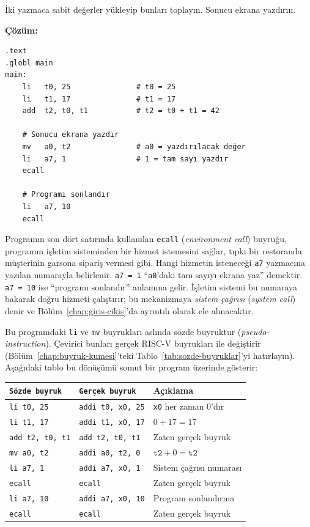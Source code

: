 \begin{ornek}[4.1]
\label{orn:iki-yazmac-topla}
İki yazmaca sabit değerler yükleyip bunları toplayın. Sonucu ekrana yazdırın.

\textbf{Çözüm:}

\begin{lstlisting}[style=riscv]
.text
.globl main
main:
    li   t0, 25               # t0 = 25
    li   t1, 17               # t1 = 17
    add  t2, t0, t1           # t2 = t0 + t1 = 42

    # Sonucu ekrana yazdır
    mv   a0, t2               # a0 = yazdırılacak değer
    li   a7, 1                # 1 = tam sayı yazdır
    ecall

    # Programı sonlandır
    li   a7, 10
    ecall
\end{lstlisting}

Programın son dört satırında kullanılan \texttt{ecall} (\emph{environment call}) buyruğu, programın işletim sisteminden bir hizmet istemesini sağlar, tıpkı bir restoranda müşterinin garsona sipariş vermesi gibi. Hangi hizmetin isteneceği \texttt{a7} yazmacına yazılan numarayla belirlenir. \texttt{a7\,=\,1} ``\texttt{a0}'daki tam sayıyı ekrana yaz'' demektir. \texttt{a7\,=\,10} ise ``programı sonlandır'' anlamına gelir. İşletim sistemi bu numaraya bakarak doğru hizmeti çalıştırır; bu mekanizmaya \emph{sistem çağrısı} (\emph{system call}) denir ve Bölüm~\ref{chap:giris-cikis}'da ayrıntılı olarak ele alınacaktır.

Bu programdaki \texttt{li} ve \texttt{mv} buyrukları aslında sözde buyruktur (\emph{pseudo-instruction}). Çevirici bunları gerçek RISC-V buyrukları ile değiştirir (Bölüm~\ref{chap:buyruk-kumesi}'teki Tablo~\ref{tab:sozde-buyruklar}'yi hatırlayın). Aşağıdaki tablo bu dönüşümü somut bir program üzerinde gösterir:

\begin{center}
\small
\begin{tabular}{lll}
\toprule
\texttt{Sözde buyruk} & \texttt{Gerçek buyruk} & Açıklama \\
\midrule
\texttt{li t0, 25}  & \texttt{addi t0, x0, 25} & \texttt{x0} her zaman 0'dır \\
\texttt{li t1, 17}  & \texttt{addi t1, x0, 17} & $0 + 17 = 17$ \\
\texttt{add t2, t0, t1} & \texttt{add t2, t0, t1} & Zaten gerçek buyruk \\
\texttt{mv a0, t2}  & \texttt{addi a0, t2, 0}  & $\texttt{t2} + 0 = \texttt{t2}$ \\
\texttt{li a7, 1}   & \texttt{addi a7, x0, 1}  & Sistem çağrısı numarası \\
\texttt{ecall}       & \texttt{ecall}            & Zaten gerçek buyruk \\
\texttt{li a7, 10}  & \texttt{addi a7, x0, 10} & Program sonlandırma \\
\texttt{ecall}       & \texttt{ecall}            & Zaten gerçek buyruk \\
\bottomrule
\end{tabular}


\end{center}
\end{ornek}
